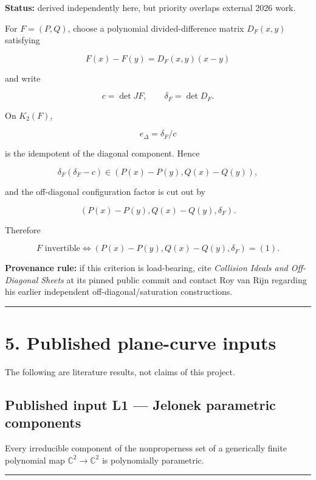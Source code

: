 \textbf{Status:} derived independently here, but priority overlaps
external 2026 work.

For \(F=(P,Q)\), choose a polynomial divided-difference matrix
\(D_F(x,y)\) satisfying

\[
F(x)-F(y)=D_F(x,y)(x-y)
\]

and write

\[
c=\det JF,\qquad \delta_F=\det D_F.
\]

On \(K_2(F)\),

\[
e_\Delta=\delta_F/c
\]

is the idempotent of the diagonal component. Hence

\[
\delta_F(\delta_F-c)
\in
(P(x)-P(y),Q(x)-Q(y)),
\]

and the off-diagonal configuration factor is cut out by

\[
(P(x)-P(y),Q(x)-Q(y),\delta_F).
\]

Therefore

\[
F\text{ invertible}
\Longleftrightarrow
(P(x)-P(y),Q(x)-Q(y),\delta_F)=(1).
\]

\textbf{Provenance rule:} if this criterion is load-bearing, cite
\emph{Collision Ideals and Off-Diagonal Sheets} at its pinned public
commit and contact Roy van Rijn regarding his earlier independent
off-diagonal/saturation constructions.

\begin{center}\rule{0.5\linewidth}{0.5pt}\end{center}

\section{5. Published plane-curve
inputs}\label{published-plane-curve-inputs}

The following are literature results, not claims of this project.

\subsection{Published input L1 --- Jelonek parametric
components}\label{published-input-l1-jelonek-parametric-components}

Every irreducible component of the nonproperness set of a generically
finite polynomial map \(\mathbb C^2\to\mathbb C^2\) is polynomially
parametric.

\begin{center}\rule{0.5\linewidth}{0.5pt}\end{center}

